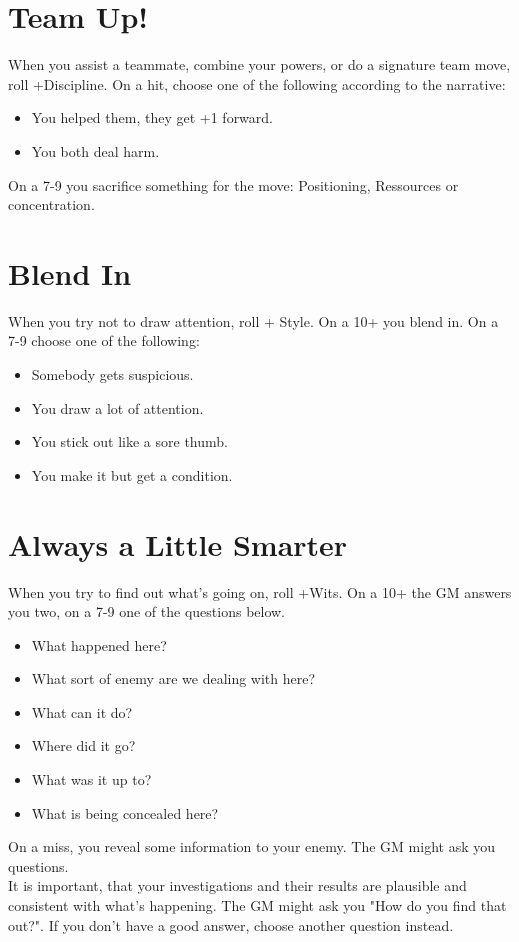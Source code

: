 \documentclass{book}
\begin{document}
\section*{Team Up!}
When you assist a teammate, combine your powers, or do a signature team move, roll +Discipline. On a hit, choose one of the following according to the narrative:
\begin{itemize}
    \item You helped them, they get +1 forward.
    \item You both deal harm.
\end{itemize}
On a 7-9 you sacrifice something for the move: Positioning, Ressources or concentration. 

\section*{Blend In}
When you try not to draw attention, roll + Style. On a 10+ you blend in. On a 7-9 choose one of the following:
\begin{itemize}
    \item Somebody gets suspicious.
    \item You draw a lot of attention.
    \item You stick out like a sore thumb.
    \item You make it but get a condition.
\end{itemize}

\section*{Always a Little Smarter}
When you try to find out what's going on, roll +Wits. On a 10+ the GM answers you two, on a 7-9 one of the questions below.
\begin{itemize}
    \item What happened here?
    \item What sort of enemy are we dealing with here?
    \item What can it do?
    \item Where did it go?
    \item What was it up to?
    \item What is being concealed here?
\end{itemize}
On a miss, you reveal some information to your enemy. The GM might ask you questions.\\
It is important, that your investigations and their results are plausible and consistent with what's happening. The GM might ask you "How do you find that out?". If you don't have a good answer, choose another question instead.
\end{document}
